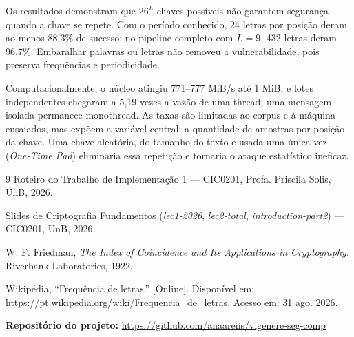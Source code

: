 \documentclass[conference]{IEEEtran}
\begin{document}
Os resultados demonstram que $26^L$ chaves possíveis não garantem
segurança quando a chave se repete. Com o período conhecido, 24 letras
por posição deram ao menos 88,3\% de sucesso; no pipeline completo com
$L=9$, 432 letras deram 96,7\%. Embaralhar palavras ou letras não
removeu a vulnerabilidade, pois preserva frequências e periodicidade.

Computacionalmente, o núcleo atingiu 771--777 MiB/s até 1 MiB, e lotes
independentes chegaram a 5,19 vezes a vazão de uma thread; uma mensagem
isolada permanece monothread. As taxas são limitadas ao corpus e à
máquina ensaiados, mas expõem a variável central: a quantidade de
amostras por posição da chave. Uma chave aleatória, do tamanho do texto
e usada uma única vez (\emph{One-Time Pad}) eliminaria essa repetição e
tornaria o ataque estatístico ineficaz.

\begin{thebibliography}{9}
Roteiro do Trabalho de Implementação 1 --- CIC0201, Profa. Priscila Solis, UnB, 2026.

Slides de Criptografia Fundamentos (\textit{lec1-2026}, \textit{lec2-total}, \textit{introduction-part2}) --- CIC0201, UnB, 2026.

W. F. Friedman, \textit{The Index of Coincidence and Its Applications
in Cryptography}. Riverbank Laboratories, 1922.

Wikipédia, ``Frequência de letras.'' [Online]. Disponível em:
\url{https://pt.wikipedia.org/wiki/Frequencia_de_letras}.
Acesso em: 31 ago. 2026.
\end{thebibliography}

\begin{center}
\footnotesize\textbf{Repositório do projeto:}
\url{https://github.com/anaareiis/vigenere-seg-comp}
\end{center}
\end{document}
